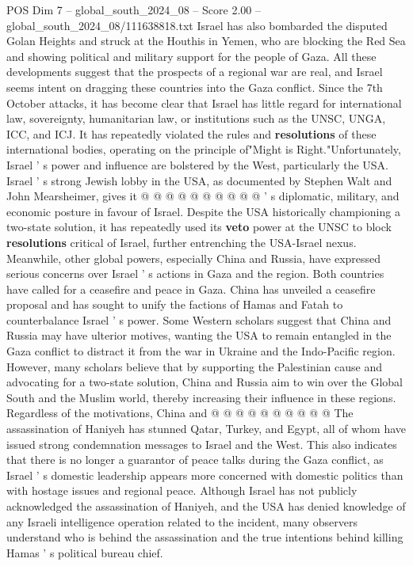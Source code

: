 \begin{textsample}{POS Dim 7 – global\_south\_2024\_08 – Score 2.00 – global\_south\_2024\_08/111638818.txt}
Israel has also bombarded the disputed Golan Heights and struck at the Houthis in Yemen, who are blocking the Red Sea and showing political and military support for the people of Gaza.
All these developments suggest that the prospects of a regional war are real, and Israel seems intent on dragging these countries into the Gaza conflict.
Since the 7th October attacks, it has become clear that Israel has little regard for international law, sovereignty, humanitarian law, or institutions such as the UNSC, UNGA, ICC, and ICJ.
It has repeatedly violated the rules and \textbf{resolutions} of these international bodies, operating on the principle of"Might is Right."Unfortunately, Israel ' s power and influence are bolstered by the West, particularly the USA.
Israel ' s strong Jewish lobby in the USA, as documented by Stephen Walt and John Mearsheimer, gives it @ @ @ @ @ @ @ @ @ @ ' s diplomatic, military, and economic posture in favour of Israel.
Despite the USA historically championing a two-state solution, it has repeatedly used its \textbf{veto} power at the UNSC to block \textbf{resolutions} critical of Israel, further entrenching the USA-Israel nexus.
Meanwhile, other global powers, especially China and Russia, have expressed serious concerns over Israel ' s actions in Gaza and the region.
Both countries have called for a ceasefire and peace in Gaza.
China has unveiled a ceasefire proposal and has sought to unify the factions of Hamas and Fatah to counterbalance Israel ' s power.
Some Western scholars suggest that China and Russia may have ulterior motives, wanting the USA to remain entangled in the Gaza conflict to distract it from the war in Ukraine and the Indo-Pacific region.
However, many scholars believe that by supporting the Palestinian cause and advocating for a two-state solution, China and Russia aim to win over the Global South and the Muslim world, thereby increasing their influence in these regions.
Regardless of the motivations, China and @ @ @ @ @ @ @ @ @ @ The assassination of Haniyeh has stunned Qatar, Turkey, and Egypt, all of whom have issued strong condemnation messages to Israel and the West.
This also indicates that there is no longer a guarantor of peace talks during the Gaza conflict, as Israel ' s domestic leadership appears more concerned with domestic politics than with hostage issues and regional peace.
Although Israel has not publicly acknowledged the assassination of Haniyeh, and the USA has denied knowledge of any Israeli intelligence operation related to the incident, many observers understand who is behind the assassination and the true intentions behind killing Hamas ' s political bureau chief.

\end{textsample}
